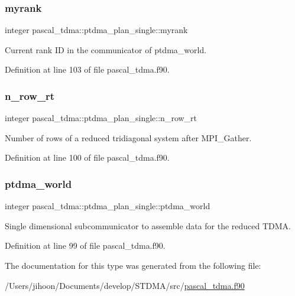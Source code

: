 \subsubsection{\texorpdfstring{myrank}{myrank}}
{\footnotesize\ttfamily integer pascal\+\_\+tdma\+::ptdma\+\_\+plan\+\_\+single\+::myrank}



Current rank ID in the communicator of ptdma\+\_\+world. 



Definition at line 103 of file pascal\+\_\+tdma.\+f90.

\mbox{\label{structpascal__tdma_1_1ptdma__plan__single_a91fd8fb919f9b7d3137b13fcaa55dc1b}} 
\subsubsection{\texorpdfstring{n\_row\_rt}{n\_row\_rt}}
{\footnotesize\ttfamily integer pascal\+\_\+tdma\+::ptdma\+\_\+plan\+\_\+single\+::n\+\_\+row\+\_\+rt}



Number of rows of a reduced tridiagonal system after M\+P\+I\+\_\+\+Gather. 



Definition at line 100 of file pascal\+\_\+tdma.\+f90.

\mbox{\label{structpascal__tdma_1_1ptdma__plan__single_a073cddefd8ef983b185b6727d8ad7de6}} 
\subsubsection{\texorpdfstring{ptdma\_world}{ptdma\_world}}
{\footnotesize\ttfamily integer pascal\+\_\+tdma\+::ptdma\+\_\+plan\+\_\+single\+::ptdma\+\_\+world}



Single dimensional subcommunicator to assemble data for the reduced T\+D\+MA. 



Definition at line 99 of file pascal\+\_\+tdma.\+f90.



The documentation for this type was generated from the following file\+:\begin{DoxyCompactItemize}
\item 
/\+Users/jihoon/\+Documents/develop/\+S\+T\+D\+M\+A/src/\mbox{\hyperlink{pascal__tdma_8f90}{pascal\+\_\+tdma.\+f90}}\end{DoxyCompactItemize}
